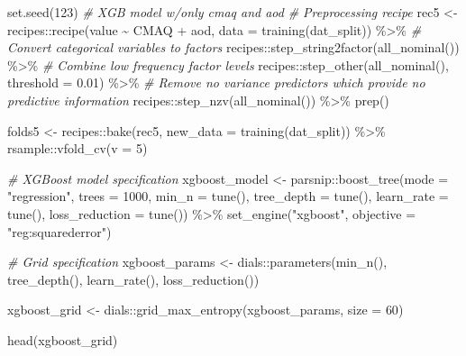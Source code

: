 \documentclass[
]{article}
\newenvironment{Shaded}{\begin{snugshade}}{\end{snugshade}}
\newcommand{\AttributeTok}[1]{\textcolor[rgb]{0.77,0.63,0.00}{#1}}
\newcommand{\CommentTok}[1]{\textcolor[rgb]{0.56,0.35,0.01}{\textit{#1}}}
\newcommand{\DecValTok}[1]{\textcolor[rgb]{0.00,0.00,0.81}{#1}}
\newcommand{\FloatTok}[1]{\textcolor[rgb]{0.00,0.00,0.81}{#1}}
\newcommand{\FunctionTok}[1]{\textcolor[rgb]{0.00,0.00,0.00}{#1}}
\newcommand{\NormalTok}[1]{#1}
\newcommand{\OtherTok}[1]{\textcolor[rgb]{0.56,0.35,0.01}{#1}}
\newcommand{\SpecialCharTok}[1]{\textcolor[rgb]{0.00,0.00,0.00}{#1}}
\newcommand{\StringTok}[1]{\textcolor[rgb]{0.31,0.60,0.02}{#1}}
\begin{document}
\begin{Shaded}
\begin{Highlighting}[]
\FunctionTok{set.seed}\NormalTok{(}\DecValTok{123}\NormalTok{)}
\CommentTok{\# XGB model w/only cmaq and aod}
\CommentTok{\# Preprocessing recipe}
\NormalTok{rec5 }\OtherTok{\textless{}{-}} 
\NormalTok{  recipes}\SpecialCharTok{::}\FunctionTok{recipe}\NormalTok{(value }\SpecialCharTok{\textasciitilde{}}\NormalTok{ CMAQ }\SpecialCharTok{+}\NormalTok{ aod, }\AttributeTok{data =} \FunctionTok{training}\NormalTok{(dat\_split)) }\SpecialCharTok{\%\textgreater{}\%}
  \CommentTok{\# Convert categorical variables to factors}
\NormalTok{  recipes}\SpecialCharTok{::}\FunctionTok{step\_string2factor}\NormalTok{(}\FunctionTok{all\_nominal}\NormalTok{()) }\SpecialCharTok{\%\textgreater{}\%}
  \CommentTok{\# Combine low frequency factor levels}
\NormalTok{  recipes}\SpecialCharTok{::}\FunctionTok{step\_other}\NormalTok{(}\FunctionTok{all\_nominal}\NormalTok{(), }\AttributeTok{threshold =} \FloatTok{0.01}\NormalTok{) }\SpecialCharTok{\%\textgreater{}\%}
  \CommentTok{\# Remove no variance predictors which provide no predictive information }
\NormalTok{  recipes}\SpecialCharTok{::}\FunctionTok{step\_nzv}\NormalTok{(}\FunctionTok{all\_nominal}\NormalTok{()) }\SpecialCharTok{\%\textgreater{}\%}
  \FunctionTok{prep}\NormalTok{()}

\NormalTok{folds5 }\OtherTok{\textless{}{-}}\NormalTok{ recipes}\SpecialCharTok{::}\FunctionTok{bake}\NormalTok{(rec5, }\AttributeTok{new\_data =} \FunctionTok{training}\NormalTok{(dat\_split)) }\SpecialCharTok{\%\textgreater{}\%}  
\NormalTok{  rsample}\SpecialCharTok{::}\FunctionTok{vfold\_cv}\NormalTok{(}\AttributeTok{v =} \DecValTok{5}\NormalTok{)}

\CommentTok{\# XGBoost model specification}
\NormalTok{xgboost\_model }\OtherTok{\textless{}{-}}\NormalTok{ parsnip}\SpecialCharTok{::}\FunctionTok{boost\_tree}\NormalTok{(}\AttributeTok{mode =} \StringTok{"regression"}\NormalTok{, }\AttributeTok{trees =} \DecValTok{1000}\NormalTok{, }\AttributeTok{min\_n =} \FunctionTok{tune}\NormalTok{(),}
  \AttributeTok{tree\_depth =} \FunctionTok{tune}\NormalTok{(), }\AttributeTok{learn\_rate =} \FunctionTok{tune}\NormalTok{(), }\AttributeTok{loss\_reduction =} \FunctionTok{tune}\NormalTok{()) }\SpecialCharTok{\%\textgreater{}\%}
  \FunctionTok{set\_engine}\NormalTok{(}\StringTok{"xgboost"}\NormalTok{, }\AttributeTok{objective =} \StringTok{"reg:squarederror"}\NormalTok{)}

\CommentTok{\# Grid specification}
\NormalTok{xgboost\_params }\OtherTok{\textless{}{-}}\NormalTok{ dials}\SpecialCharTok{::}\FunctionTok{parameters}\NormalTok{(}\FunctionTok{min\_n}\NormalTok{(), }\FunctionTok{tree\_depth}\NormalTok{(), }\FunctionTok{learn\_rate}\NormalTok{(), }\FunctionTok{loss\_reduction}\NormalTok{())}

\NormalTok{xgboost\_grid }\OtherTok{\textless{}{-}}\NormalTok{ dials}\SpecialCharTok{::}\FunctionTok{grid\_max\_entropy}\NormalTok{(xgboost\_params, }\AttributeTok{size =} \DecValTok{60}\NormalTok{)}

\FunctionTok{head}\NormalTok{(xgboost\_grid)}
\end{Highlighting}
\end{Shaded}
\end{document}
